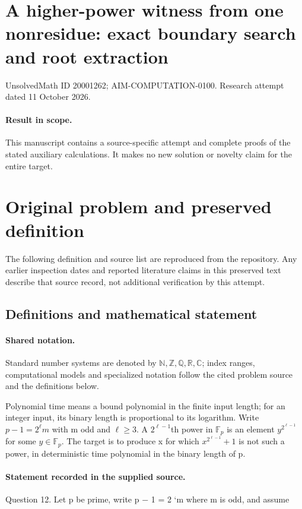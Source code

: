 \documentclass[11pt]{article}
\begin{document}
\section*{A higher-power witness from one nonresidue: exact boundary search and root extraction}
\noindent UnsolvedMath ID 20001262; AIM-COMPUTATION-0100. Research attempt dated 11 October 2026.
\paragraph{Result in scope.}This manuscript contains a source-specific attempt and complete proofs of the stated auxiliary calculations. It makes no new solution or novelty claim for the entire target.
\section{Original problem and preserved definition}
The following definition and source list are reproduced from the repository. Any earlier inspection dates and reported literature claims in this preserved text describe that source record, not additional verification by this attempt.
\subsection{Definitions and mathematical statement}

\paragraph{Shared notation.}Standard number systems are denoted by $\mathbb N,\mathbb Z,\mathbb Q,\mathbb R,\mathbb C$; index ranges, computational models and specialized notation follow the cited problem source and the definitions below.


Polynomial time means a bound polynomial in the finite input length; for an integer input, its binary length is proportional to its logarithm. Write $p-1=2^\ell m$ with m odd and $\ell\ge3$. A $2^{\ell-1}$th power in $\mathbb F_p$ is an element $y^{2^{\ell-1}}$ for some $y\in\mathbb F_p$. The target is to produce x for which $x^{2^{\ell-1}}+1$ is not such a power, in deterministic time polynomial in the binary length of p.
\paragraph{Statement recorded in the supplied source.}
Question 12. Let p be prime, write p − 1 = 2 `m where m is odd, and assume
\end{document}
